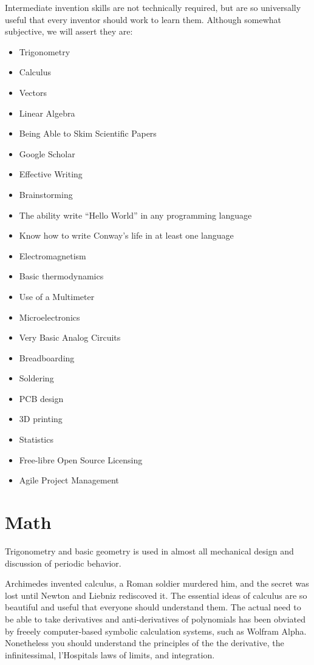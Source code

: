 \documentclass[
	fontsize=10pt, %
	twoside=false, %
	secnumdepth=1, %
]{kaobook}
\begin{document}
Intermediate invention skills are not technically required,
but are so universally useful that every inventor should
work to learn them. Although somewhat subjective,
we will assert they are:
\begin{itemize}
\item Trigonometry
\item Calculus
\item Vectors
\item Linear Algebra
\item Being Able to Skim Scientific Papers
\item Google Scholar
\item Effective Writing
\item Brainstorming
\item The ability write “Hello World” in any programming language
\item Know how to write Conway’s life in at least one language
\item Electromagnetism
\item Basic thermodynamics
\item Use of a Multimeter
\item Microelectronics
\item Very Basic Analog Circuits
\item Breadboarding
\item Soldering
\item PCB design
\item 3D printing
\item Statistics
\item Free-libre Open Source Licensing
\item Agile Project Management
\end{itemize}


\section{Math}

Trigonometry and basic geometry is used in almost all mechanical
design and discussion of periodic behavior.

Archimedes invented calculus, a Roman soldier murdered him,
and the secret was lost until Newton and Liebniz rediscoved it.
The essential ideas of calculus are so beautiful and useful
that everyone should understand them. The actual need to be
able to take derivatives and anti-derivatives of
polynomials has been obviated by freeely computer-based symbolic
calculation systems, such as Wolfram Alpha.
Nonetheless you should understand the principles of the
the derivative, the infinitessimal, l'Hospitals laws of limits,
and integration.
\end{document}
